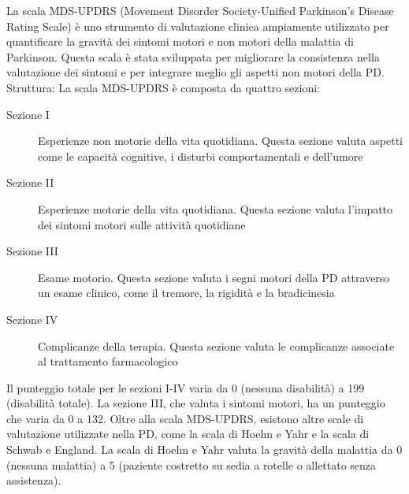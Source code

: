 \begin{Oss}
	La scala MDS-UPDRS (Movement Disorder Society-Unified Parkinson's Disease Rating Scale) è uno strumento di valutazione clinica ampiamente utilizzato per quantificare la gravità dei sintomi motori e non motori della malattia di Parkinson. Questa scala è stata sviluppata per migliorare la consistenza nella valutazione dei sintomi e per integrare meglio gli aspetti non motori della PD.
	Struttura: La scala MDS-UPDRS è composta da quattro sezioni:
	\begin{description}
		\item[Sezione I]{Esperienze non motorie della vita quotidiana. Questa sezione valuta aspetti come le capacità cognitive, i disturbi comportamentali e dell'umore}
		\item [Sezione II]{Esperienze motorie della vita quotidiana. Questa sezione valuta l'impatto dei sintomi motori sulle attività quotidiane}
		\item [Sezione III]{Esame motorio. Questa sezione valuta i segni motori della PD attraverso un esame clinico, come il tremore, la rigidità e la bradicinesia}
		\item[Sezione IV]{Complicanze della terapia. Questa sezione valuta le complicanze associate al trattamento farmacologico}
	\end{description}
	Il punteggio totale per le sezioni I-IV varia da 0 (nessuna disabilità) a 199 (disabilità totale). La sezione III, che valuta i sintomi motori, ha un punteggio che varia da 0 a 132.
	Oltre alla scala MDS-UPDRS, esistono altre scale di valutazione utilizzate nella PD, come la scala di Hoehn e Yahr e la scala di Schwab e England. La scala di Hoehn e Yahr valuta la gravità della malattia da 0 (nessuna malattia) a 5 (paziente costretto su sedia a rotelle o allettato senza assistenza).
\end{Oss}

